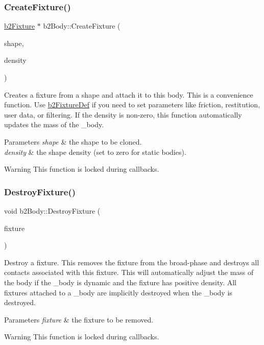 \subsubsection{\texorpdfstring{Create\+Fixture()}{CreateFixture()}\hspace{0.1cm}{\footnotesize\ttfamily [2/2]}}
{\footnotesize\ttfamily \mbox{\hyperlink{classb2Fixture}{b2\+Fixture}} $\ast$ b2\+Body\+::\+Create\+Fixture (\begin{DoxyParamCaption}\item[{const \mbox{\hyperlink{classb2Shape}{b2\+Shape}} $\ast$}]{shape,  }\item[{float32}]{density }\end{DoxyParamCaption})}

Creates a fixture from a shape and attach it to this body. This is a convenience function. Use \mbox{\hyperlink{structb2FixtureDef}{b2\+Fixture\+Def}} if you need to set parameters like friction, restitution, user data, or filtering. If the density is non-\/zero, this function automatically updates the mass of the _body.
\begin{DoxyParams}{Parameters}
{\em shape} & the shape to be cloned. \\
\hline
{\em density} & the shape density (set to zero for static bodies). \\
\hline
\end{DoxyParams}
\begin{DoxyWarning}{Warning}
This function is locked during callbacks. 
\end{DoxyWarning}
\mbox{\label{classb2Body_a856d1df86b7bded91f02d8cfcaea1c2f}} 
\subsubsection{\texorpdfstring{Destroy\+Fixture()}{DestroyFixture()}}
{\footnotesize\ttfamily void b2\+Body\+::\+Destroy\+Fixture (\begin{DoxyParamCaption}\item[{\mbox{\hyperlink{classb2Fixture}{b2\+Fixture}} $\ast$}]{fixture }\end{DoxyParamCaption})}

Destroy a fixture. This removes the fixture from the broad-\/phase and destroys all contacts associated with this fixture. This will automatically adjust the mass of the body if the _body is dynamic and the fixture has positive density. All fixtures attached to a _body are implicitly destroyed when the _body is destroyed.
\begin{DoxyParams}{Parameters}
{\em fixture} & the fixture to be removed. \\
\hline
\end{DoxyParams}
\begin{DoxyWarning}{Warning}
This function is locked during callbacks. 
\end{DoxyWarning}
\mbox{\label{classb2Body_a20b9c8d0d722edf3af281034d37bd534}} 
